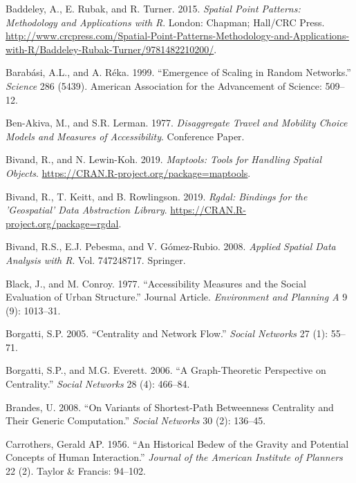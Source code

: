 \documentclass[]{elsarticle} %
\begin{document}
\hypertarget{ref-Baddeley2015spatial}{}
Baddeley, A., E. Rubak, and R. Turner. 2015. \emph{Spatial Point
Patterns: Methodology and Applications with R}. London: Chapman;
Hall/CRC Press.
\url{http://www.crcpress.com/Spatial-Point-Patterns-Methodology-and-Applications-with-R/Baddeley-Rubak-Turner/9781482210200/}.

\hypertarget{ref-barabasi1999}{}
Barabási, A.L., and A. Réka. 1999. ``Emergence of Scaling in Random
Networks.'' \emph{Science} 286 (5439). American Association for the
Advancement of Science: 509--12.

\hypertarget{ref-BenAkiva1977accessibility}{}
Ben-Akiva, M., and S.R. Lerman. 1977. \emph{Disaggregate Travel and
Mobility Choice Models and Measures of Accessibility}. Conference Paper.

\hypertarget{ref-Bivand2019maptools}{}
Bivand, R., and N. Lewin-Koh. 2019. \emph{Maptools: Tools for Handling
Spatial Objects}. \url{https://CRAN.R-project.org/package=maptools}.

\hypertarget{ref-Bivand2019rgdal}{}
Bivand, R., T. Keitt, and B. Rowlingson. 2019. \emph{Rgdal: Bindings for
the 'Geospatial' Data Abstraction Library}.
\url{https://CRAN.R-project.org/package=rgdal}.

\hypertarget{ref-bivand2008applied}{}
Bivand, R.S., E.J. Pebesma, and V. Gómez-Rubio. 2008. \emph{Applied
Spatial Data Analysis with R}. Vol. 747248717. Springer.

\hypertarget{ref-Black1977}{}
Black, J., and M. Conroy. 1977. ``Accessibility Measures and the Social
Evaluation of Urban Structure.'' Journal Article. \emph{Environment and
Planning A} 9 (9): 1013--31.

\hypertarget{ref-Borgatti2005centrality}{}
Borgatti, S.P. 2005. ``Centrality and Network Flow.'' \emph{Social
Networks} 27 (1): 55--71.

\hypertarget{ref-Borgatti2006}{}
Borgatti, S.P., and M.G. Everett. 2006. ``A Graph-Theoretic Perspective
on Centrality.'' \emph{Social Networks} 28 (4): 466--84.

\hypertarget{ref-Brandes2008}{}
Brandes, U. 2008. ``On Variants of Shortest-Path Betweenness Centrality
and Their Generic Computation.'' \emph{Social Networks} 30 (2): 136--45.

\hypertarget{ref-Carrothers1956historical}{}
Carrothers, Gerald AP. 1956. ``An Historical Bedew of the Gravity and
Potential Concepts of Human Interaction.'' \emph{Journal of the American
Institute of Planners} 22 (2). Taylor \& Francis: 94--102.
\end{document}
